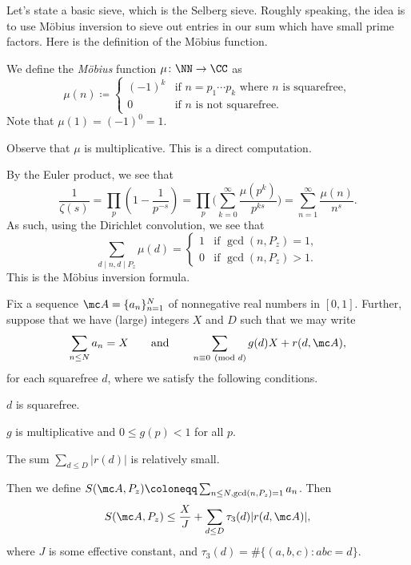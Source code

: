 \documentclass[../notes.tex]{subfiles}
\begin{document}
Let's state a basic sieve, which is the Selberg sieve. Roughly speaking, the idea is to use M\"obius inversion to sieve out entries in our sum which have small prime factors. Here is the definition of the M\"obius function.
\begin{defihelper}[$\mu$] 
	We define the \textit{M\"obius} function $\mu\colon\NN\to\CC$ as
	\[\mu(n)\coloneqq\begin{cases}
		(-1)^k & \text{if }n=p_1\cdots p_k\text{ where }n\text{ is squarefree}, \\
		0 & \text{if }n\text{ is not squarefree}.
	\end{cases}\]
	Note that $\mu(1)=(-1)^0=1$.
\end{defihelper}
\begin{remark}
	Observe that $\mu$ is multiplicative. This is a direct computation.
\end{remark}
\begin{remark} \label{rem:m-inversion}
	By the Euler product, we see that
	\[\frac1{\zeta(s)}=\prod_p\left(1-\frac1{p^{-s}}\right)=\prod_p\Bigg(\sum_{k=0}^\infty\frac{\mu\left(p^k\right)}{p^{ks}}\Bigg)=\sum_{n=1}^\infty\frac{\mu(n)}{n^s}.\]
	As such, using the Dirichlet convolution, we see that
	\[\sum_{d\mid n,d\mid P_z}\mu(d)=\begin{cases}
		1 & \text{if }\gcd(n,P_z)=1, \\
		0 & \text{if }\gcd(n,P_z)>1.
	\end{cases}\]
	This is the M\"obius inversion formula.
\end{remark}
\begin{proposition} \label{prop:selberg}
	Fix a sequence $\mc A=\{a_n\}_{n=1}^N$ of nonnegative real numbers in $[0,1]$. Further, suppose that we have (large) integers $X$ and $D$ such that we may write
	\[\sum_{n\le N}a_n=X\qquad\text{and}\qquad\sum_{n\equiv0\pmod d}g(d)X+r(d,\mc A),\]
	for each squarefree $d$, where we satisfy the following conditions.
	\begin{listroman}
		\item $d$ is squarefree.
		\item $g$ is multiplicative and $0\le g(p)<1$ for all $p$.
		\item The sum $\sum_{d\le D}|r(d)|$ is relatively small.
	\end{listroman}
	Then we define $S(\mc A,P_z)\coloneqq\sum_{n\le N,\gcd(n,P_z)=1}a_n$. Then
	\[S(\mc A,P_z)\le\frac XJ+\sum_{d\le D}\tau_3(d)|r(d,\mc A)|,\]
	where $J$ is some effective constant, and $\tau_3(d)=\#\{(a,b,c):abc=d\}$.
\end{proposition}
\end{document}
